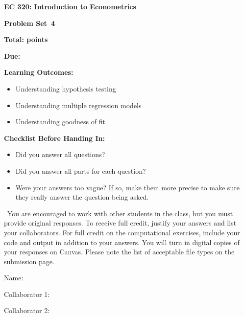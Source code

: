 \documentclass[11pt]{article}
\begin{document}
\begin{onehalfspacing}

\begin{center}
\textbf{EC 320: Introduction to Econometrics} \bigskip

\textbf{Problem Set\bigskip\ 4}
\bigskip
\end{center}


\noindent \textbf{Total: points}

\noindent \textbf{Due: }

\bigskip

\noindent \textbf{Learning Outcomes:}
\begin{itemize}
\item Understanding hypothesis testing
\item Understanding multiple regression models
\item Understanding goodness of fit 
\end{itemize}

\bigskip


\noindent \textbf{Checklist Before Handing In:}
\begin{itemize}
\item Did you answer all questions?
\item Did you answer all parts for each question?
\item Were your answers too vague? If so, make them more precise to make sure they really answer the question being asked.
\end{itemize}

\bigskip

\ You are encouraged to work with other students in the class, but you must provide original responses. To receive full credit, justify your answers and list your collaborators. For full credit on the computational exercises, include your code and output in addition to your answers. You will turn in digital copies of your responses on Canvas. Please note the list of acceptable file types on the submission page.  \\
\vspace{0.1in}

Name: 			\\
\vspace{0.1in}

Collaborator 1: \\

\vspace{0.1in}

Collaborator 2: \\
	

\end{onehalfspacing}
\end{document}
